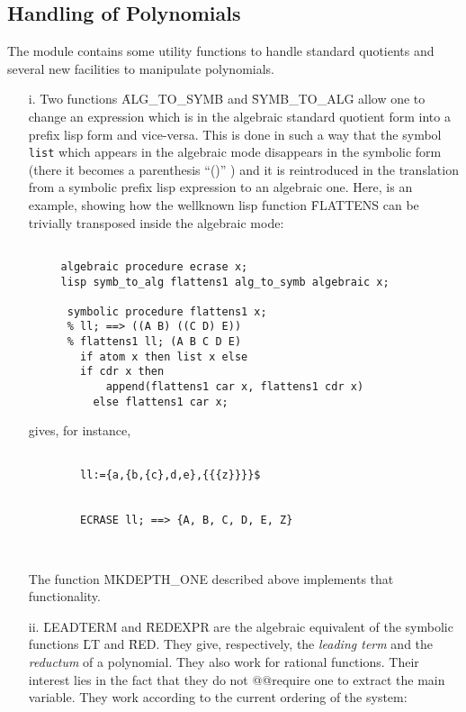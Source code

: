 \subsection{Handling of Polynomials}
The module contains some utility functions to handle
standard quotients and several new facilities to manipulate polynomials.
\begin{itemize}
\item[i.] Two functions \f{ALG\_TO\_SYMB} and \f{SYMB\_TO\_ALG}
allow one to change an expression which is in the algebraic standard
quotient form into a prefix lisp form and vice-versa. This is done
in such a way that the symbol \verb+list+ which appears in the
algebraic mode disappears in the symbolic form (there it becomes
a parenthesis ``()'' ) and it is reintroduced in the translation
from a symbolic prefix lisp expression  to an algebraic one.
Here, is an example, showing how the wellknown lisp function
\f{FLATTENS} can be trivially transposed inside the algebraic mode:
\begin{verbatim}

     algebraic procedure ecrase x;
     lisp symb_to_alg flattens1 alg_to_symb algebraic x;

      symbolic procedure flattens1 x;
      % ll; ==> ((A B) ((C D) E))
      % flattens1 ll; (A B C D E)
        if atom x then list x else
        if cdr x then
            append(flattens1 car x, flattens1 cdr x)
          else flattens1 car x;

\end{verbatim}


gives, for instance,
\begin{verbatim}

        ll:={a,{b,{c},d,e},{{{z}}}}$


        ECRASE ll; ==> {A, B, C, D, E, Z}



\end{verbatim}
The function \f{MKDEPTH\_ONE} described above implements that functionality.
\item[ii.]
\f{LEADTERM} and \f{REDEXPR} are the algebraic equivalent of the
symbolic functions \f{LT} and \f{RED}. They give, respectively, the
{\em leading term} and the {\em reductum} of a polynomial. They also work
for rational functions. Their interest lies in the fact that they do not
@@require one to extract the main variable. They work according to the current
ordering of the system:
\begin{verbatim}


\end{verbatim}
\end{itemize}
